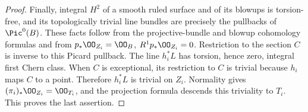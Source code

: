\begin{proof}
Finally, integral $H^2$ of a smooth ruled surface and of its blowups is torsion-free, and its topologically trivial line bundles are precisely the pullbacks of $\Pic^0(B)$. These facts follow from the projective-bundle and blowup cohomology formulas and from $p_*\OO_{Z_i}=\OO_B$, $R^1p_*\OO_{Z_i}=0$. Restriction to the section $C$ is inverse to this Picard pullback. The line $h_i^*L$ has torsion, hence zero, integral first Chern class. When $C$ is exceptional, its restriction to $C$ is trivial because $h_i$ maps $C$ to a point. Therefore $h_i^*L$ is trivial on $Z_i$. Normality gives $(\pi_i)_*\OO_{Z_i}=\OO_{T_i}$, and the projection formula descends this triviality to $T_i$. This proves the last assertion.
\end{proof}



